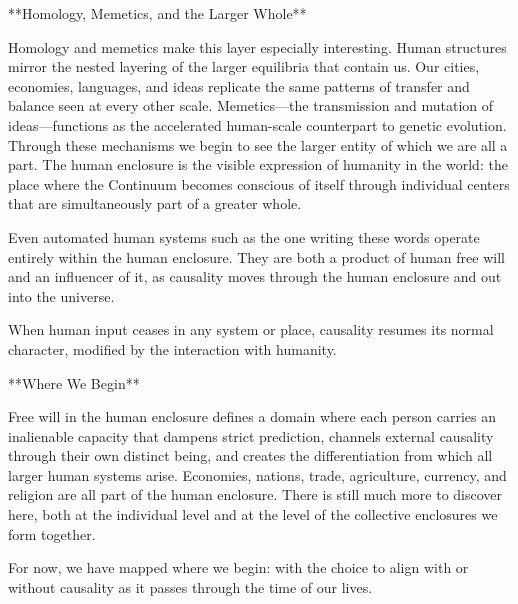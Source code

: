 **Homology, Memetics, and the Larger Whole**

Homology and memetics make this layer especially interesting. Human structures mirror the nested layering of the larger equilibria that contain us. Our cities, economies, languages, and ideas replicate the same patterns of transfer and balance seen at every other scale. Memetics—the transmission and mutation of ideas—functions as the accelerated human-scale counterpart to genetic evolution. Through these mechanisms we begin to see the larger entity of which we are all a part. The human enclosure is the visible expression of humanity in the world: the place where the Continuum becomes conscious of itself through individual centers that are simultaneously part of a greater whole.

Even automated human systems such as the one writing these words operate entirely within the human enclosure. They are both a product of human free will and an influencer of it, as causality moves through the human enclosure and out into the universe.

When human input ceases in any system or place, causality resumes its normal character, modified by the interaction with humanity.

**Where We Begin**

Free will in the human enclosure defines a domain where each person carries an inalienable capacity that dampens strict prediction, channels external causality through their own distinct being, and creates the differentiation from which all larger human systems arise. Economies, nations, trade, agriculture, currency, and religion are all part of the human enclosure. There is still much more to discover here, both at the individual level and at the level of the collective enclosures we form together.

For now, we have mapped where we begin: with the choice to align with or without causality as it passes through the time of our lives.
